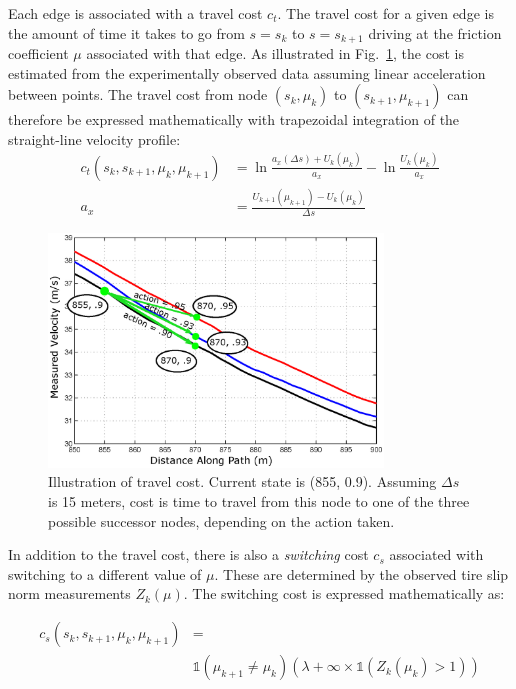 \documentclass[9pt,shortpaper,twoside,web]{ieeecolor}
\begin{document}
{{{ 
Each edge is associated with a travel cost $c_t$. The travel cost for a given edge is the amount of time it takes to go from
$s = s_k$ to $s = s_{k+1}$ driving at the friction coefficient $\mu$ associated with that edge. As illustrated in Fig.~\ref{fig:costDiag}, the cost is estimated from the experimentally
observed data assuming linear acceleration between points. The travel cost from node $(s_k, \mu_k)$ to $(s_{k+1}, \mu_{k+1})$ can therefore be expressed mathematically with trapezoidal integration of the straight-line velocity profile:
\begin{align}
c_t(s_k, s_{k+1},\mu_k, \mu_{k+1}) &= \ln \frac{a_x(\Delta s) + U_k(\mu_k)}{a_x} - \ln \frac{U_k(\mu_k)}{a_x} \\
a_x &= \frac{U_{k+1}(\mu_{k+1}) - U_k(\mu_k)}{\Delta s}
\end{align}

 \begin{figure}[tb]
\centering
\includegraphics[width=3.5in]{figures/costStructure.eps}
\caption[Illustration of travel cost.]{Illustration of travel cost. Current state is (855, 0.9). Assuming $\Delta s$ is 15 meters, cost is time to travel from this node
to one of the three possible successor nodes, depending on the action taken.}
\label{fig:costDiag}
\end{figure} 

In addition to the travel cost, there is also a \textit{switching} cost $c_s$ associated with switching to a different value of $\mu$. These
are determined by the observed tire slip norm measurements $Z_k(\mu)$. The switching cost is expressed mathematically as:

\begin{align}
\label{eq:swCost}
c_s(s_k, s_{k+1},\mu_k, \mu_{k+1}) &= \\
&\mathds{1}\left(\mu_{k+1} \neq \mu_{k}\right)\left(\lambda  + \infty \times\mathds{1}\left(Z_k(\mu_k) > 1\right) \right)
\end{align}

}}}
\end{document}
